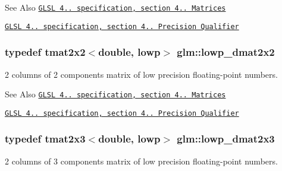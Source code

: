 \begin{DoxySeeAlso}{See Also}
\href{http://www.opengl.org/registry/doc/GLSLangSpec.4.20.8.pdf}{\tt G\-L\-S\-L 4.. specification, section 4.. Matrices} 

\href{http://www.opengl.org/registry/doc/GLSLangSpec.4.20.8.pdf}{\tt G\-L\-S\-L 4.. specification, section 4.. Precision Qualifier} 
\end{DoxySeeAlso}
\hypertarget{group__core__precision_ga62d3af99b9e0659d693c80b75df9a35c}{
\subsubsection[{lowp\-\_\-dmat2x2}]{\setlength{\rightskip}{0pt plus 5cm}typedef tmat2x2$<$double, lowp$>$ {\bf glm\-::lowp\-\_\-dmat2x2}}}\label{group__core__precision_ga62d3af99b9e0659d693c80b75df9a35c}
2 columns of 2 components matrix of low precision floating-\/point numbers.

\begin{DoxySeeAlso}{See Also}
\href{http://www.opengl.org/registry/doc/GLSLangSpec.4.20.8.pdf}{\tt G\-L\-S\-L 4.. specification, section 4.. Matrices} 

\href{http://www.opengl.org/registry/doc/GLSLangSpec.4.20.8.pdf}{\tt G\-L\-S\-L 4.. specification, section 4.. Precision Qualifier} 
\end{DoxySeeAlso}
\hypertarget{group__core__precision_gada78eb998a9c716aedee01501456b94d}{
\subsubsection[{lowp\-\_\-dmat2x3}]{\setlength{\rightskip}{0pt plus 5cm}typedef tmat2x3$<$double, lowp$>$ {\bf glm\-::lowp\-\_\-dmat2x3}}}\label{group__core__precision_gada78eb998a9c716aedee01501456b94d}
2 columns of 3 components matrix of low precision floating-\/point numbers.

